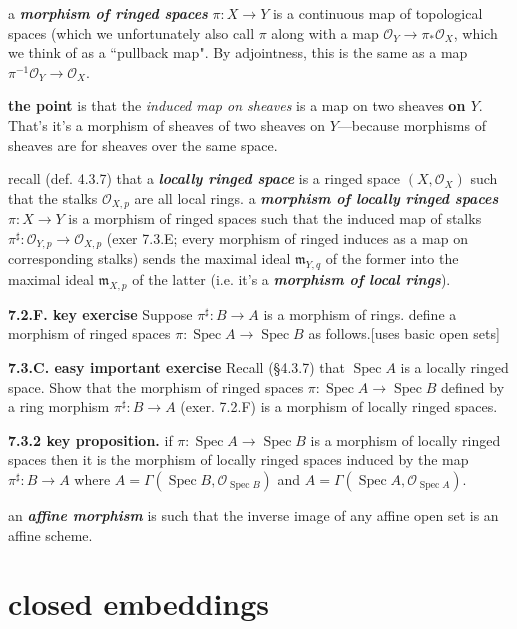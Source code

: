 a \textit{\textbf{morphism of ringed spaces}} \(\pi:X \to Y\) is a continuous map of topological spaces (which we unfortunately also call \(\pi\) along with a map \(\mathcal{O}_Y \to \pi_*\mathcal{O}_X\), which we think of as a ``pullback map". By adjointness, this is the same as a map \(\pi^{-1}\mathcal{O}_Y \to \mathcal{O}_X\).

\textbf{the point} is that the \textit{induced map on sheaves} is a map on two sheaves \textbf{on \(Y\)}. That's it's a morphism of sheaves of two sheaves on \(Y\)---because morphisms of sheaves are for sheaves over the same space. 

recall (def. 4.3.7) that a \textit{\textbf{locally ringed space}} is a ringed space \((X,\mathcal{O}_X)\) such that the stalks \(\mathcal{O}_{X,p}\) are all local rings. a \textit{\textbf{morphism of locally ringed spaces}} \(\pi:X \to Y\) is a morphism of ringed spaces such that the induced map of stalks \(\pi^\sharp:\mathcal{O}_{Y,p} \to \mathcal{O}_{X,p}\) (exer 7.3.E; every morphism of ringed induces as a map on corresponding stalks) sends the maximal ideal \(\mathfrak{m}_{Y,q}\) of the former into the maximal ideal \(\mathfrak{m}_{X,p}\) of the latter (i.e. it's a \textit{\textbf{morphism of local rings}}).

\textbf{7.2.F. key exercise} Suppose \(\pi^\sharp:B \to A\) is a morphism of rings. define a morphism of ringed spaces \(\pi:\operatorname{Spec}A \to \operatorname{Spec}B\) as follows.[uses basic open sets]

\textbf{7.3.C. easy important exercise} Recall (§4.3.7) that \(\operatorname{Spec}A\) is a locally ringed space. Show that the morphism of ringed spaces \(\pi:\operatorname{Spec}A \to \operatorname{Spec}B\) defined by a ring morphism \(\pi^\sharp:B \to A\) (exer. 7.2.F) is a morphism of locally ringed spaces.

\textbf{7.3.2 key proposition.} if \(\pi:\operatorname{Spec}A \to \operatorname{Spec}B\) is a morphism of locally ringed spaces then it is the morphism of locally ringed spaces induced by the map  \(\pi^\sharp:B \to A\) where \(A=\Gamma(\operatorname{Spec}B,\mathcal{O}_{\operatorname{Spec}B})\) and \(A=\Gamma(\operatorname{Spec}A,\mathcal{O}_{\operatorname{Spec}A})\).

an \textit{\textbf{affine morphism}} is such that the inverse image of any affine open set is an affine scheme.

\section{closed embeddings}

